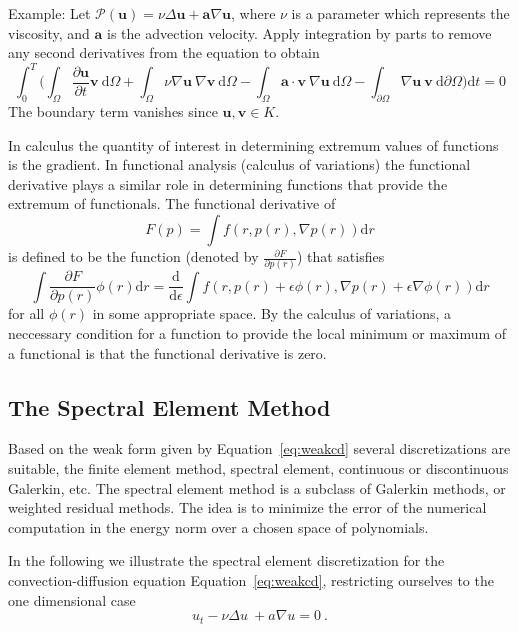 \documentclass[10pt]{article}
\renewcommand{\d}{\mathrm{d}}
\begin{document}
Example: Let $\mathcal P(\mathbf u) = \nu \Delta \mathbf u + \mathbf a  \nabla \mathbf u$, where $\nu$ is a parameter which represents the viscosity, and $\mathbf a$ is the advection velocity. Apply integration by parts to remove any second derivatives from the equation to obtain
\begin{equation}
\int_0^T \bigg( \int_{\Omega}\frac{\partial\mathbf u}{\partial t} \mathbf v \ \d \Omega + \int_{\Omega} \nu\nabla \mathbf u\ \nabla \mathbf v\ \d \Omega - \int_{\Omega} \mathbf a \cdot \mathbf v\ \nabla \mathbf u\ \d \Omega-
 \int_{\partial \Omega} \nabla \mathbf u \ \mathbf v\  \d \partial \Omega \bigg) \d t =0\label{eq:weakcd}
\end{equation}
The boundary term vanishes since $\mathbf u, \mathbf v \in K.$

In calculus the quantity of interest in determining extremum values of functions is the gradient. In functional analysis (calculus of variations) the functional
derivative plays a similar role in determining functions that provide the extremum of functionals. The functional derivative of
\[
F(p) = \int f(r,p(r),\nabla p(r)) \d r
\]
is defined to be the function (denoted by $ \frac{\partial F}{\partial p(r)}$) that satisfies
\[
\int \frac{\partial F}{\partial p(r)} \phi(r) \d r = \frac{\d}{\d \epsilon} \int f(r,p(r) + \epsilon \phi(r),\nabla p(r) + \epsilon \nabla \phi(r) ) \d r
\]
for all $ \phi(r)$ in some appropriate space. By the calculus of variations, a neccessary condition for a function to provide the local
minimum or maximum of a functional is that the functional derivative is zero.




\subsection{The Spectral Element Method}
\label{sec:sem}

Based on the weak form given by Equation~\ref{eq:weakcd} several discretizations are suitable, the finite element method, spectral element, continuous or discontinuous Galerkin, etc.
The spectral element method is a subclass of Galerkin methods, or weighted residual methods. 
The idea is to minimize the error of the numerical computation in the energy norm over a chosen space of polynomials. 

In the following we illustrate the spectral element discretization for the convection-diffusion equation Equation~\ref{eq:weakcd}, restricting ourselves to the one dimensional case
\begin{equation}
u_t - \nu\Delta u\ +a \nabla u=0\ . \label{eq:1dcd}
\end{equation}
\end{document}
